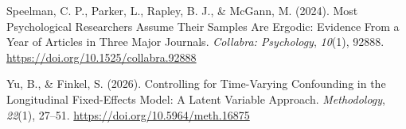 \documentclass[
  man,
  floatsintext,
  longtable,
  nolmodern,
  notxfonts,
  notimes,
  colorlinks=true,linkcolor=blue,citecolor=blue,urlcolor=blue]{apa7}
\newlength{\cslhangindent}
\newenvironment{CSLReferences}[2] %
 {\begin{list}{}{%
  \setlength{\itemindent}{0pt}
  \setlength{\leftmargin}{0pt}
  \setlength{\parsep}{0pt}
  \ifodd #1
   \setlength{\leftmargin}{\cslhangindent}
   \setlength{\itemindent}{-1\cslhangindent}
  \fi
  \setlength{\itemsep}{#2\baselineskip}}}
 {\end{list}}
\begin{document}
\begin{CSLReferences}{1}{0}
Speelman, C. P., Parker, L., Rapley, B. J., \& McGann, M. (2024). Most
{Psychological Researchers Assume Their Samples Are Ergodic}: {Evidence
From} a {Year} of {Articles} in {Three Major Journals}. \emph{Collabra:
Psychology}, \emph{10}(1), 92888.
\url{https://doi.org/10.1525/collabra.92888}

Yu, B., \& Finkel, S. (2026). Controlling for {Time-Varying Confounding}
in the {Longitudinal Fixed-Effects Model}: {A Latent Variable Approach}.
\emph{Methodology}, \emph{22}(1), 27--51.
\url{https://doi.org/10.5964/meth.16875}

\end{CSLReferences}
\end{document}
